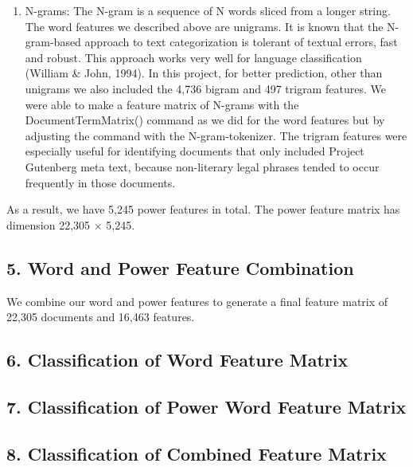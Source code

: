 \documentclass[12pt,]{article}
\begin{document}
\begin{enumerate}
\def\labelenumi{(\arabic{enumi})}
\setcounter{enumi}{2}
\itemsep1pt\parskip0pt
\item
  N-grams: The N-gram is a sequence of N words sliced from a longer
  string. The word features we described above are unigrams. It is known
  that the N-gram-based approach to text categorization is tolerant of
  textual errors, fast and robust. This approach works very well for
  language classification (William \& John, 1994). In this project, for
  better prediction, other than unigrams we also included the 4,736
  bigram and 497 trigram features. We were able to make a feature matrix
  of N-grams with the DocumentTermMatrix() command as we did for the
  word features but by adjusting the command with the N-gram-tokenizer.
  The trigram features were especially useful for identifying documents
  that only included Project Gutenberg meta text, because non-literary
  legal phrases tended to occur frequently in those documents.
\end{enumerate}

As a result, we have 5,245 power features in total. The power feature
matrix has dimension 22,305 \(\times\) 5,245.

\subsection{{5. Word and Power Feature
Combination}}\label{word-and-power-feature-combination}

We combine our word and power features to generate a final feature
matrix of 22,305 documents and 16,463 features.

\subsection{{6. Classification of Word Feature
Matrix}}\label{classification-of-word-feature-matrix}

\subsection{{7. Classification of Power Word Feature
Matrix}}\label{classification-of-power-word-feature-matrix}

\subsection{{8. Classification of Combined Feature
Matrix}}\label{classification-of-combined-feature-matrix}
\end{document}
